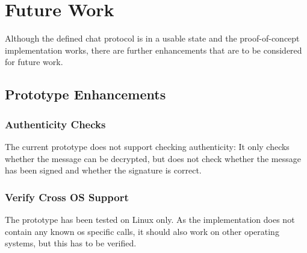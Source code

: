 \section{Future Work}
Although the defined chat protocol is in a usable
state and the proof-of-concept implementation works, there are further
enhancements that are to be considered for future work.
\subsection{Prototype Enhancements}
\subsubsection{Authenticity Checks}
The current prototype does not support checking authenticity: It only checks
whether the message can be decrypted, but does not check whether the message
has been signed and whether the signature is correct.
\subsubsection{Verify Cross OS Support}
The prototype has been tested on Linux only. As the implementation does not
contain any known os specific calls, it should also work on other operating
systems, but this has to be verified.
